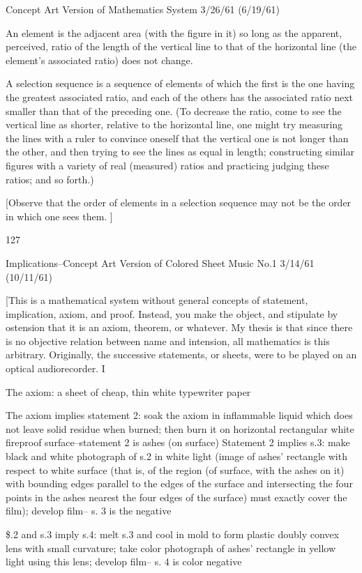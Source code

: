 \documentclass[10pt,twoside]{memoir}
\begin{document}
\begin{enumerate}
{\begin{enumerate}
\begin{sysrules}
\begin{sysrules}
\begin{sysrules}
\begin{sysrules}
{\begin{enumerate}
{{Concept Art Version of Mathematics System 3/26/61 (6/19/61) 

An element is the adjacent area (with the figure in it) so long as the 
apparent, perceived, ratio of the length of the vertical line to that of the 
horizontal line (the element's associated ratio) does not change. 

A selection sequence is a sequence of elements of which the first is the one 
having the greatest associated ratio, and each of the others has the associated 
ratio next smaller than that of the preceding one. (To decrease the ratio, 
come to see the vertical line as shorter, relative to the horizontal line, one 
might try measuring the lines with a ruler to convince oneself that the 
vertical one is not longer than the other, and then trying to see the lines as 
equal in length; constructing similar figures with a variety of real (measured) 
ratios and practicing judging these ratios; and so forth.) 

[Observe that the order of elements in a selection sequence may not be the 
order in which one sees them. ] 


127 


Implications--Concept Art Version of Colored Sheet Music No.1 3/14/61 
(10/11/61) 

[This is a mathematical system without general concepts of statement, 
implication, axiom, and proof. Instead, you make the object, and stipulate 
by ostension that it is an axiom, theorem, or whatever. My thesis is that 
since there is no objective relation between name and intension, all 
mathematics is this arbitrary. Originally, the successive statements, or sheets, 
were to be played on an optical audiorecorder. I 

The axiom: a sheet of cheap, thin white typewriter paper 

The axiom implies statement 2: soak the axiom in inflammable liquid which 
does not leave solid residue when burned; then burn it on horizontal 
rectangular white fireproof surface--statement 2 is ashes (on surface) 
Statement 2 implies s.3: make black and white photograph of s.2 in white 
light (image of ashes' rectangle with respect to white surface (that is, of the 
region (of surface, with the ashes on it) with bounding edges parallel to the 
edges of the surface and intersecting the four points in the ashes nearest the 
four edges of the surface) must exactly cover the film); develop film-- s. 3 is 
the negative 

\$.2 and s.3 imply s.4: melt s.3 and cool in mold to form plastic doubly 
convex lens with small curvature; take color photograph of ashes' rectangle 
in yellow light using this lens; develop film-- s. 4 is color negative 

}}
\end{enumerate}}
\end{sysrules}
\end{sysrules}
\end{sysrules}
\end{sysrules}
\end{enumerate}}
\end{enumerate}
\end{document}

